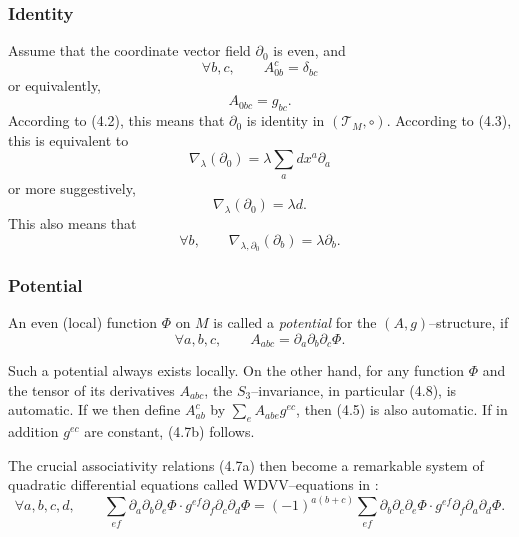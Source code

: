 \documentclass[reqno]{amsart}
\theoremstyle{definition}
\begin{document}
\medskip

\subsubsection{Identity}
Assume that the coordinate vector field
$\partial_0$ is even, and
\begin{equation*}
  \forall b,c,\qquad A_{0b}^c=\delta_{bc}
  \tag{4.10a}
\end{equation*}
or equivalently,
\begin{equation*}
  A_{0bc}=g_{bc}. \tag{4.10b}
\end{equation*}
According to (4.2), this means that $\partial_0$ is identity
in $(\mathcal{T}_M,\circ )$. According to (4.3), this is equivalent to
\begin{equation*}
  \nabla_{\lambda}(\partial_0)=\lambda\sum_adx^a\partial_a
\end{equation*}
or more suggestively,
\begin{equation*}
  \nabla_{\lambda}(\partial_0)=\lambda d.
\end{equation*}
This also means that
\begin{equation*}
  \forall b,\qquad
  \nabla_{\lambda ,\partial_0}(\partial_b)
  = \lambda \partial_b .
  \tag{4.11}
\end{equation*}

\medskip

\subsubsection{Potential}
An even (local) function $\Phi$ on $M$
is called a \textit{potential} for the $(A,g)$--structure, if
\begin{equation*}
  \forall a,b,c,\qquad A_{abc}
  = \partial_a\partial_b\partial_c\Phi.
  \tag{4.12}
\end{equation*}

Such a potential always exists locally.
On the other hand, for any function
$\Phi $ and the tensor of its derivatives $A_{abc}$,
the $S_3$--invariance, in particular (4.8), is automatic.
If we then define $A_{ab}^c$ by $\sum_eA_{abe}g^{ec}$, then
(4.5) is also automatic. If in addition $g^{ec}$ are constant,
(4.7b) follows.

\smallskip

The crucial associativity relations (4.7a) then become a
remarkable system of quadratic differential equations called
WDVV--equations in \cite{D}:
\begin{equation*}
  \forall a,b,c,d,\qquad \sum_{ef}\partial_a\partial_b\partial_e\Phi\cdot
  g^{ef}\partial_f\partial_c\partial_d\Phi =
  (-1)^{a(b+c)}\sum_{ef}\partial_b\partial_c\partial_e\Phi \cdot
  g^{ef}\partial_f\partial_a\partial_d\Phi .
  \tag{4.13}
\end{equation*}
\end{document}
